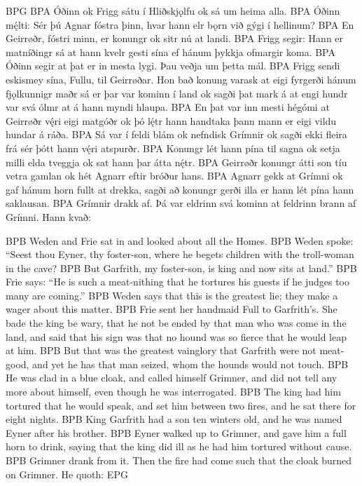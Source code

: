 BPG
BPA Óðinn ok Frigg sátu í Hliðskjǫlfu ok sá um heima alla.
BPA Óðinn mę́lti: Sér þú Agnar fóstra þinn, hvar hann elr bǫrn við gýgi í hellinum?
BPA En Geirrøðr, fóstri minn, er konungr ok sitr nú at landi.
BPA Frigg segir: Hann er matníðingr sá at hann kvelr gesti sína ef hánum þykkja ofmargir koma.
BPA Óðinn segir at þat er in mesta lygi. Þau veðja um þetta mál.
BPA Frigg sendi eskismey sína, Fullu, til Geirrøðar. Hon bað konung varask at eigi fyrgerði hánum fjǫlkunnigr maðr sá er þar var kominn í land ok sagði þat mark á at engi hundr var svá ólmr at á hann myndi hlaupa.
BPA En þat var inn mesti hégómi at Geirrøðr vę́ri eigi matgóðr ok þó lę́tr hann handtaka þann mann er eigi vildu hundar á ráða.
BPA Sá var í feldi blám ok nefndisk Grímnir ok sagði ekki fleira frá sér þótt hann vę́ri atspurðr.
BPA Konungr lét hann pína til sagna ok setja milli elda tveggja ok sat hann þar átta nę́tr.
BPA Geirrøðr konungr átti son tíu vetra gamlan ok hét Agnarr eftir bróður hans.
BPA Agnarr gekk at Grímni ok gaf hánum horn fullt at drekka, sagði að konungr gerði illa er hann lét pína hann saklausan.
BPA Grímnir drakk af. Þá var eldrinn svá kominn at feldrinn brann af Grímni. Hann kvað:

BPB Weden and Frie sat in  and looked about all the Homes.
BPB Weden spoke: “Seest thou Eyner, thy foster-son, where he begets children with the troll-woman in the cave?
BPB But Garfrith, my foster-son, is king and now sits at land.”
BPB Frie says: “He is such a meat-nithing that he tortures his guests if he judges too many are coming.”
BPB Weden says that this is the greatest lie; they make a wager about this matter.
BPB Frie sent her handmaid Full to Garfrith’s. She bade the king be wary, that he not be ended by that  man who was come in the land, and said that his sign was that no hound was so fierce that he would leap at him.
BPB But that was the greatest vainglory that Garfrith were not meat-good, and yet he has that man seized, whom the hounds would not touch.
BPB He was clad in a blue cloak, and called himself Grimner, and did not tell any more about himself, even though he was interrogated.
BPB The king had him tortured that he would speak, and set him between two fires, and he sat there for eight nights.
BPB King Garfrith had a son ten winters old, and he was named Eyner after his brother.
BPB Eyner walked up to Grimner, and gave him a full horn to drink, saying that the king did ill as he had him tortured without cause.
BPB Grimner drank from it. Then the fire had come such that the cloak burned on Grimner. He quoth:
EPG


